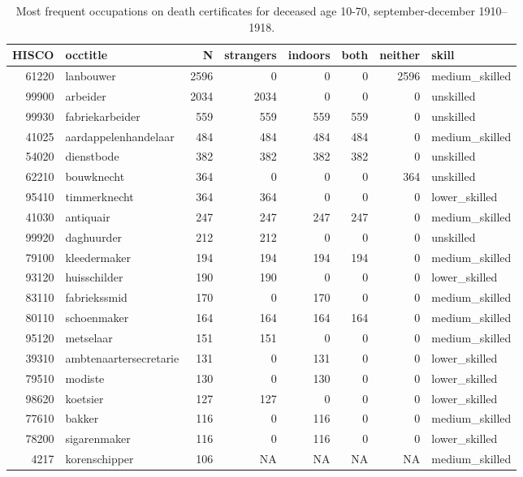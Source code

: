 \begin{table}

\caption{\label{tab:tab:topoccs_selected}Most frequent occupations on death certificates for deceased age 10-70, september-december 1910–1918.}
\centering
\begin{tabular}[t]{r|l|r|r|r|r|r|l}
\hline
HISCO & occtitle & N & strangers & indoors & both & neither & skill\\
\hline
61220 & lanbouwer & 2596 & 0 & 0 & 0 & 2596 & medium\_skilled\\
\hline
99900 & arbeider & 2034 & 2034 & 0 & 0 & 0 & unskilled\\
\hline
99930 & fabriekarbeider & 559 & 559 & 559 & 559 & 0 & unskilled\\
\hline
41025 & aardappelenhandelaar & 484 & 484 & 484 & 484 & 0 & medium\_skilled\\
\hline
54020 & dienstbode & 382 & 382 & 382 & 382 & 0 & unskilled\\
\hline
62210 & bouwknecht & 364 & 0 & 0 & 0 & 364 & unskilled\\
\hline
95410 & timmerknecht & 364 & 364 & 0 & 0 & 0 & lower\_skilled\\
\hline
41030 & antiquair & 247 & 247 & 247 & 247 & 0 & medium\_skilled\\
\hline
99920 & daghuurder & 212 & 212 & 0 & 0 & 0 & unskilled\\
\hline
79100 & kleedermaker & 194 & 194 & 194 & 194 & 0 & medium\_skilled\\
\hline
93120 & huisschilder & 190 & 190 & 0 & 0 & 0 & lower\_skilled\\
\hline
83110 & fabriekssmid & 170 & 0 & 170 & 0 & 0 & medium\_skilled\\
\hline
80110 & schoenmaker & 164 & 164 & 164 & 164 & 0 & medium\_skilled\\
\hline
95120 & metselaar & 151 & 151 & 0 & 0 & 0 & medium\_skilled\\
\hline
39310 & ambtenaartersecretarie & 131 & 0 & 131 & 0 & 0 & lower\_skilled\\
\hline
79510 & modiste & 130 & 0 & 130 & 0 & 0 & lower\_skilled\\
\hline
98620 & koetsier & 127 & 127 & 0 & 0 & 0 & lower\_skilled\\
\hline
77610 & bakker & 116 & 0 & 116 & 0 & 0 & medium\_skilled\\
\hline
78200 & sigarenmaker & 116 & 0 & 116 & 0 & 0 & lower\_skilled\\
\hline
4217 & korenschipper & 106 & NA & NA & NA & NA & medium\_skilled\\
\hline
\end{tabular}
\end{table}
